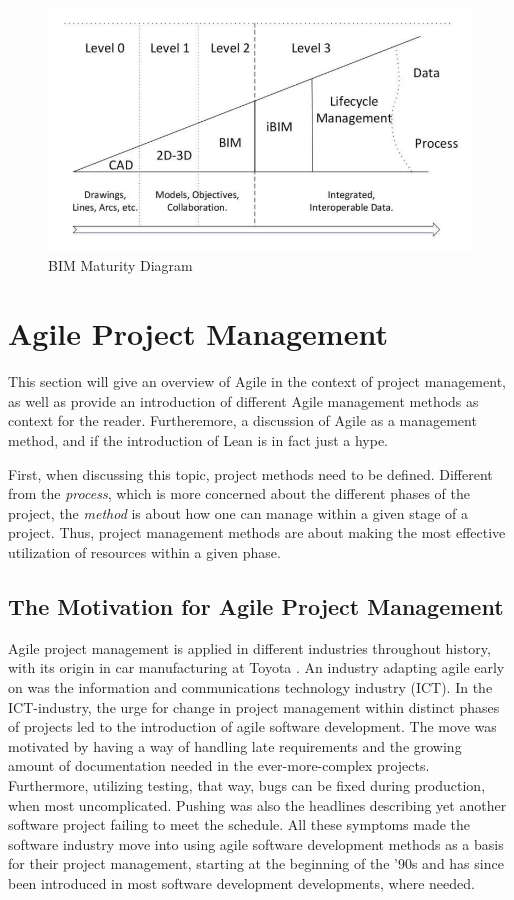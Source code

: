 \begin{figure}
    \centering
    \includegraphics[width=\textwidth]{fig/bim-diagram.png}
    \caption{BIM Maturity Diagram \cite{bew2008bim}}
    \label{fig:bim_levels}
\end{figure}


\section{Agile Project Management}
This section will give an overview of Agile in the context of project management, as well as provide an introduction of different Agile management methods as context for the reader. Furtheremore, a discussion of Agile as a management method, and if the introduction of Lean is in fact just a hype. 

First, when discussing this topic, project methods need to be defined. Different from the \textit{process}, which is more concerned about the different phases of the project, the \textit{method} is about how one can manage within a given stage of a project. Thus, project management methods are about making the most effective utilization of resources within a given phase. 

\subsection{The Motivation for Agile Project Management}
Agile project management is applied in different industries throughout history, with its origin in car manufacturing at Toyota \cite{liker2004toyota, japan1986kanban, shook2002lean}. An industry adapting agile early on was the information and communications technology industry (ICT).  In the ICT-industry, the urge for change in project management within distinct phases of projects led to the introduction of agile software development. The move was motivated by having a way of handling late requirements and the growing amount of documentation needed in the ever-more-complex projects. Furthermore, utilizing testing, that way, bugs can be fixed during production, when most uncomplicated. Pushing was also the headlines describing yet another software project failing to meet the schedule. All these symptoms made the software industry move into using agile software development methods as a basis for their project management, starting at the beginning of the '90s and has since been introduced in most software development developments, where needed.  


